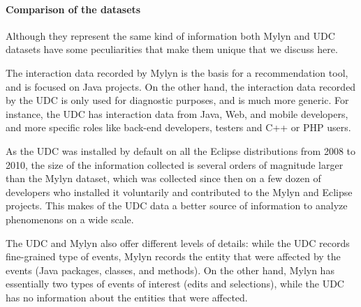 \documentclass[times]{smrauth}
\begin{document}
\paragraph{Comparison of the datasets}
Although they represent the same kind of information both Mylyn and UDC datasets have some peculiarities that make them unique that we discuss here.

The interaction data recorded by Mylyn is the basis for a recommendation tool, and is focused on Java projects. On the other hand, the interaction data recorded by the UDC is only used for diagnostic purposes, and is much more generic. For instance, the UDC has interaction data from Java, Web, and mobile developers, and more specific roles like back-end developers, testers and C++ or PHP users. 

As the UDC was installed by default on all the Eclipse distributions from 2008 to 2010, the size of the information collected is several orders of magnitude larger than the Mylyn dataset, which was collected since then on a few dozen of developers who installed it voluntarily and contributed to the Mylyn and Eclipse projects. This makes of the UDC data a better source of information to analyze phenomenons on a wide scale.

The UDC and Mylyn also offer different levels of details: while the UDC records fine-grained type of events, Mylyn records the entity that were affected by the events (Java packages, classes, and methods). On the other hand, Mylyn has essentially two types of events of interest (edits and selections), while the UDC has no information about the entities that were affected.




\end{document}
